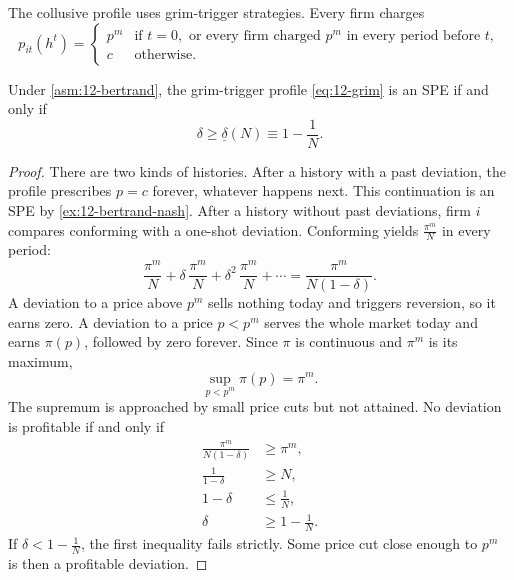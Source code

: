 The collusive profile uses grim-trigger strategies. Every firm charges
\begin{equation}\label{eq:12-grim}
p_{it}(h^t) =
\begin{cases}
p^m & \text{if } t = 0, \text{ or every firm charged } p^m \text{ in every period before } t, \\[2pt]
c & \text{otherwise.}
\end{cases}
\end{equation}

\begin{proposition}\label{prop:12-bertrand}
Under \cref{asm:12-bertrand}, the grim-trigger profile \eqref{eq:12-grim} is an SPE if and only if
\begin{equation}\label{eq:12-bertrand-delta}
\delta \ge \underline\delta(N) \equiv 1 - \frac{1}{N} .
\end{equation}
\end{proposition}

\begin{proof}
There are two kinds of histories. After a history with a past deviation, the profile prescribes $p = c$ forever,
whatever happens next. This continuation is an SPE by \cref{ex:12-bertrand-nash}. After a history without past
deviations, firm $i$ compares conforming with a one-shot deviation. Conforming yields $\frac{\pi^m}{N}$ in every period:
\begin{equation*}
\frac{\pi^m}{N} + \delta\,\frac{\pi^m}{N} + \delta^2\,\frac{\pi^m}{N} + \cdots = \frac{\pi^m}{N(1 - \delta)} .
\end{equation*}
A deviation to a price above $p^m$ sells nothing today and triggers reversion, so it earns zero. A deviation to a
price $p < p^m$ serves the whole market today and earns $\pi(p)$, followed by zero forever. Since $\pi$ is continuous
and $\pi^m$ is its maximum,
\begin{equation*}
\sup_{p < p^m}\pi(p) = \pi^m .
\end{equation*}
The supremum is approached by small price cuts but not attained. No deviation is profitable if and only if
\begin{align*}
\frac{\pi^m}{N(1 - \delta)} &\ge \pi^m , \\
\frac{1}{1 - \delta} &\ge N , \\
1 - \delta &\le \frac{1}{N} , \\
\delta &\ge 1 - \frac{1}{N} .
\end{align*}
If $\delta < 1 - \frac{1}{N}$, the first inequality fails strictly. Some price cut close enough to $p^m$ is then a
profitable deviation.
\end{proof}


